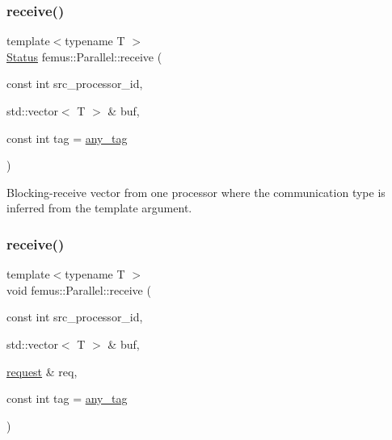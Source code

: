 \subsubsection{\texorpdfstring{receive()}{receive()}\hspace{0.1cm}{\footnotesize\ttfamily [3/4]}}
{\footnotesize\ttfamily template$<$typename T $>$ \\
\mbox{\hyperlink{classfemus_1_1_parallel_1_1_status}{Status}} femus\+::\+Parallel\+::receive (\begin{DoxyParamCaption}\item[{const int}]{src\+\_\+processor\+\_\+id,  }\item[{std\+::vector$<$ T $>$ \&}]{buf,  }\item[{const int}]{tag = {\ttfamily \mbox{\hyperlink{namespacefemus_1_1_parallel_a928996065f46cb52e89e132cdcb30328}{any\+\_\+tag}}} }\end{DoxyParamCaption})\hspace{0.3cm}{\ttfamily [inline]}}

Blocking-\/receive vector from one processor where the communication type is inferred from the template argument. \mbox{\label{namespacefemus_1_1_parallel_ac38ae778cd7241660643837071894115}} 
\subsubsection{\texorpdfstring{receive()}{receive()}\hspace{0.1cm}{\footnotesize\ttfamily [4/4]}}
{\footnotesize\ttfamily template$<$typename T $>$ \\
void femus\+::\+Parallel\+::receive (\begin{DoxyParamCaption}\item[{const int}]{src\+\_\+processor\+\_\+id,  }\item[{std\+::vector$<$ T $>$ \&}]{buf,  }\item[{\mbox{\hyperlink{structfemus_1_1_parallel_1_1request}{request}} \&}]{req,  }\item[{const int}]{tag = {\ttfamily \mbox{\hyperlink{namespacefemus_1_1_parallel_a928996065f46cb52e89e132cdcb30328}{any\+\_\+tag}}} }\end{DoxyParamCaption})\hspace{0.3cm}{\ttfamily [inline]}}

